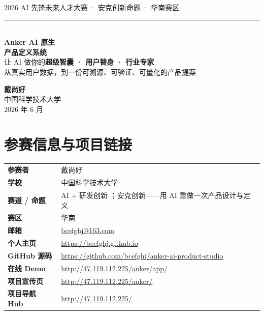 \documentclass[11pt,a4paper,fontset=fandol]{ctexart}
\begin{document}
\begin{titlepage}
\centering
\vspace*{2.2cm}
{\fontsize{16}{20}\selectfont\color{soft} 2026 AI 先锋未来人才大赛 · 安克创新命题 · 华南赛区}\\[0.4cm]
{\color{soft}\rule{0.5\linewidth}{0.4pt}}\\[1.4cm]
{\fontsize{34}{42}\selectfont\bfseries\color{primary} Anker AI 原生\\[0.2cm]产品定义系统}\\[1.0cm]
{\fontsize{15}{22}\selectfont\color{ink} 让 AI 做你的\textbf{超级智囊 · 用户替身 · 行业专家}}\\[0.3cm]
{\fontsize{13}{20}\selectfont\color{soft} 从真实用户数据，到一份可溯源、可验证、可量化的产品提案}\\[2.2cm]


\vfill
{\large\bfseries 戴尚好}\\[0.2cm]
{\color{soft} 中国科学技术大学}\\[0.2cm]
{\color{soft} 2026 年 6 月}
\end{titlepage}

\thispagestyle{empty}
\vspace*{1.2cm}
\section*{参赛信息与项目链接}
\vspace{0.4cm}
{\renewcommand{\arraystretch}{1.4}
\begin{tabularx}{\linewidth}{p{3.2cm} X}
\toprule
\textbf{参赛者} & 戴尚好 \\
\textbf{学校} & 中国科学技术大学 \\
\textbf{赛道 / 命题} & AI + 研发创新 ；安克创新——用 AI 重做一次产品设计与定义 \\
\textbf{赛区} & 华南 \\
\textbf{邮箱} & \href{mailto:bcefghj@163.com}{bcefghj@163.com} \\
\textbf{个人主页} & \url{https://bcefghj.github.io} \\
\textbf{GitHub 源码} & \url{https://github.com/bcefghj/anker-ai-product-studio} \\
\textbf{在线 Demo} & \url{http://47.119.112.225/anker/app/} \\
\textbf{项目宣传页} & \url{http://47.119.112.225/anker/} \\
\textbf{项目导航 Hub} & \url{http://47.119.112.225/} \\
\bottomrule
\end{tabularx}}
\end{document}
